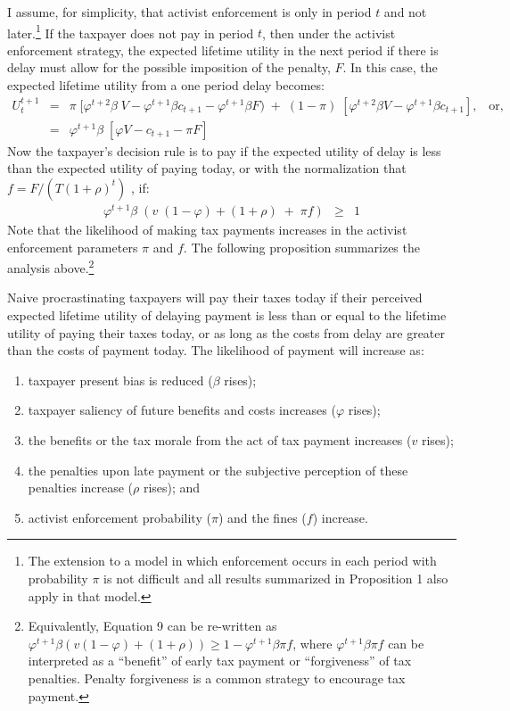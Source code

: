 I assume, for simplicity, that activist enforcement is only in period
$t$ and not later.\footnote{The extension to a model in which
  enforcement occurs in each period with probability $\pi$ is not
  difficult and all results summarized in Proposition 1 also apply in
  that model.}  If the taxpayer does not pay in period $t$, then
under the activist enforcement strategy, the expected lifetime utility
in the next period if there is delay must allow for the possible
imposition of the penalty, $F$.  In this case, the expected lifetime
utility from a one period delay becomes:
\begin{eqnarray}\label{eq8}
U_t^{t+1} &=& \pi  \; [\varphi^{t+2} \beta \; V - \varphi^{t+1} \beta c_
  {t+1} - \varphi^{t+1} \beta F ) \; +  \; (1-\pi) \;  [\varphi^{t+2} \beta V -
    \varphi^{t+1} \beta c_ {t+1}], \; \; \; \mbox{or}, \nonumber  \\ 
&=& \varphi^{t+1} \beta \; [ \varphi V - c_ {t+1} - \pi F ]
 \end{eqnarray}
Now the taxpayer's decision rule is to pay if the expected utility of
delay is less than the expected utility of paying today, or with the
normalization that $f = F/(T(1 + \rho)^{t})$ , if:
\begin{eqnarray}\label{eq9}
\varphi^{t+1} \beta \; (v \; (1-\varphi) + (1 + \rho) \; + \; \pi f)
&\ge& 1
\end{eqnarray}
Note that the likelihood of making tax payments increases in the
activist enforcement parameters $\pi$ and $f$. The following proposition  
summarizes the analysis above.\footnote{Equivalently, Equation 9 can be re-written as $\varphi^{t+1} \beta (v (1-\varphi) + (1 + \rho) ) \ge 1 - \varphi^{t+1}\beta\pi f$, where $\varphi^{t+1}\beta\pi f$ can be interpreted as a ``benefit'' of early tax payment or ``forgiveness'' of tax penalties. Penalty forgiveness is a common strategy to encourage tax payment. }
\begin{prop}
Naive procrastinating taxpayers will pay their taxes today if their
perceived expected lifetime utility of delaying payment is less
than or equal to the lifetime utility of paying their taxes today, or as long as the costs from delay are greater than the costs of payment today. The likelihood of payment will increase as:
\begin{enumerate}
\item taxpayer present bias is reduced ($\beta$ rises); 
\item taxpayer saliency of future benefits and costs increases
  ($\varphi$ rises);
\item the benefits or the tax morale from the act of tax payment increases ($v$ rises);
\item the  penalties upon late payment or the subjective perception of these penalties increase
  ($\rho$ rises); and
\item activist enforcement probability ($\pi$) and the fines ($f$) increase.
\end{enumerate}
\end{prop}
